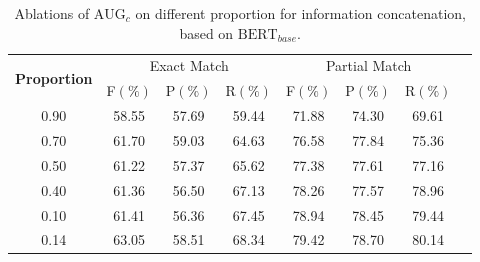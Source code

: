 \documentclass[a4paper,fleqn]{cas-dc}
\newcommand{\1}[1]{\mathds{1}\left[#1\right]}
\begin{document}
\begin{table}[width=.6\textwidth,cols=8,pos=h]
	\caption{Ablations of $\text{AUG}_{c}$ on different proportion for information concatenation, based on $\text{BERT}_{base}$.} 
	\label{tab:different_ratio_bert}
	\begin{tabular*}{\tblwidth}{cccccccc}
		\toprule
		\multirow{2}{*}{\textbf{Proportion}} & \multicolumn{3}{c}{Exact Match} & \multicolumn{3}{c}{Partial Match}  \\
		\cline{2-7} 
		\addlinespace
		& F\((\%)\) & P\((\%)\) & R\((\%)\) & F\((\%)\) & P\((\%)\) & R\((\%)\) \\
		\midrule
		0.90 & 58.55 & 57.69 & 59.44 & 71.88 & 74.30 & 69.61 \\ 
		0.70 & 61.70 & 59.03 & 64.63 & 76.58 & 77.84 & 75.36 \\
		0.50 & 61.22 & 57.37 & 65.62 & 77.38 & 77.61 & 77.16 \\
		0.40 & 61.36 & 56.50 & 67.13 & 78.26 & 77.57 & 78.96 \\
		0.10 & 61.41 & 56.36 & 67.45 & 78.94 & 78.45 & 79.44 \\
		0.14 & 63.05 & 58.51 & 68.34 & 79.42 & 78.70 & 80.14 \\
		\bottomrule
	\end{tabular*}
\end{table}



%
\end{document}
